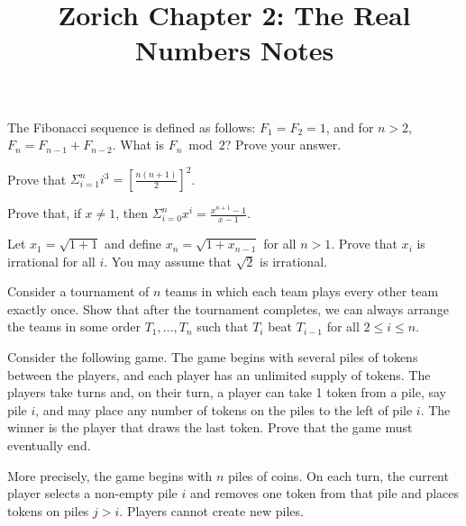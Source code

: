 \documentclass[letter]{article}
\title{Zorich Chapter 2: The Real Numbers Notes}
\date{}
\newenvironment{problem}[1][Problem]{\begin{trivlist}
\item[\hskip \labelsep {\bfseries #1}]}{\end{trivlist}}
\begin{document}
\maketitle
\vspace{-.5in}

\begin{problem}[Problem 1]
The Fibonacci sequence is defined as follows: $F_1=F_2=1$, and for
$n>2$, $F_n=F_{n-1}+F_{n-2}$.  What is $F_n\bmod 2$?  Prove your
answer.
\end{problem}

\begin{problem}[Problem 2]
Prove that $\Sigma_{i=1}^{n}i^3=\left[\frac{n(n+1)}{2}\right]^2$.
\end{problem}

\begin{problem}[Problem 3]
Prove that, if $x\not=1$, then $\Sigma_{i=0}^{n}x^i=\frac{x^{n+1}-1}{x-1}$.
\end{problem}

\begin{problem}[Problem 4]
Let $x_1=\sqrt{1+1}$ and define $x_n=\sqrt{1+x_{n-1}}$ for all $n>1$.
Prove that $x_i$ is irrational for all $i$.  You may assume that
$\sqrt{2}$ is irrational.
\end{problem}


\begin{problem}[Problem 5]
Consider a tournament of $n$ teams in which each team plays every
other team exactly once.  Show that after the tournament completes, we
can always arrange the teams in some order $T_1, \ldots, T_n$ such
that $T_i$ beat $T_{i-1}$ for all $2\leq i\leq n$.
\end{problem}


\begin{problem}[Problem 6]
Consider the following game.  The game begins with several piles of
tokens between the players, and each player has an unlimited supply of
tokens.  The players take turns and, on their turn, a player can take
1 token from a pile, say pile $i$, and may place any number of tokens
on the piles to the left of pile $i$.  The winner is the player that
draws the last token.  Prove that the game must eventually end.

More precisely, the game begins with $n$ piles of coins.  On each
turn, the current player selects a non-empty pile $i$ and removes one
token from that pile and places tokens on piles $j>i$.  Players cannot
create new piles.
\end{problem}
\end{document}
